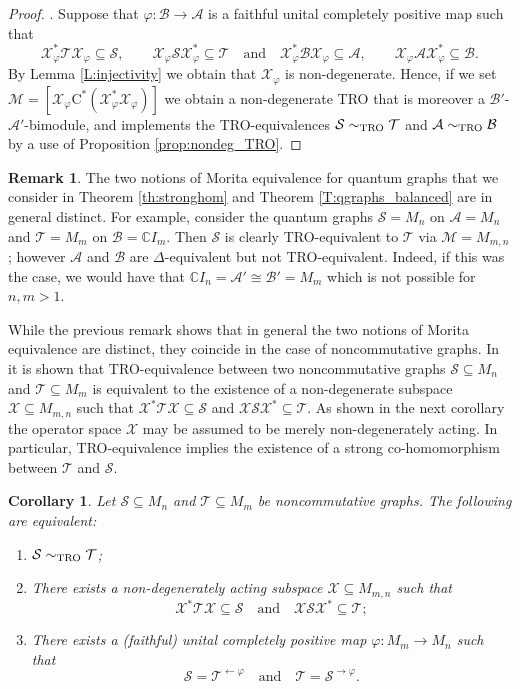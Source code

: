 \documentclass[11pt]{amsart}
\numberwithin{equation}{section}
\theoremstyle{plain}
\newtheorem{corollary}[theorem]{Corollary}
\theoremstyle{definition}
\newtheorem{remark}[theorem]{Remark}
\theoremstyle{remark}
\newcommand{\A}{{\mathcal{A}}}
\newcommand{\B}{{\mathcal{B}}}
\newcommand{\M}{{\mathcal{M}}}
\renewcommand{\S}{{\mathcal{S}}}
\newcommand{\T}{{\mathcal{T}}}
\newcommand{\X}{{\mathcal{X}}}
\def\De{\Delta}
\newcommand\vphi{\varphi}
\newcommand{\bC}{\mathbb{C}}
\newcommand{\qand}{\quad\text{and}\quad}
\newcommand{\ca}{\mathrm{C}^*}
\begin{document}
\begin{proof}
\medskip
\noindent
[(ii) $\Rightarrow$ (i)].
Suppose that
$\vphi\colon\B\to \A$ is a faithful unital completely positive map such that
\[
\X_\vphi^*\T\X_\vphi\subseteq \S,
\qquad
\X_\vphi \S \X_\vphi^*\subseteq \T 
\qand
\X_\vphi^*\B\X_\vphi\subseteq \A,
\qquad
\X_\vphi\A\X_\vphi^*\subseteq \B.
\]
By Lemma \ref{L:injectivity} we obtain that $\X_{\vphi}$ is non-degenerate. Hence, if we set $ \M = [\X_{\vphi} \ca(\X_{\vphi}^*\X_{\vphi})]$ we obtain a non-degenerate TRO that is moreover a $\B'$-$\A'$-bimodule, and implements the TRO-equivalences $\S\sim_{\rm TRO}\T$ and $\A\sim_{\rm TRO}\B$ by a use of Proposition \ref{prop:nondeg_TRO}.
\end{proof}

\begin{remark}
The two notions of Morita equivalence for quantum graphs that we consider in Theorem \ref{th:stronghom} and Theorem \ref{T:qgraphs_balanced} are in general distinct. For example, consider the quantum graphs $\S=M_n$ on $\A = M_n$ and $ \T= M_m$ on $\B=\bC I_m$. Then $ \S$ is clearly TRO-equivalent to $\T $ via $\M= M_{m,n}$; however $ \A$ and $\B$ are $\De$-equivalent but not TRO-equivalent. Indeed, if this was the case, we would have that $\bC I_n= \A' \cong \B'= M_m$ which is not possible for $ n,m>1$.    
\end{remark}

While the previous remark shows that in general the two notions of Morita equivalence are distinct, they coincide in the case of noncommutative graphs. In \cite[Proposition 7.2]{EKT21} it is shown that TRO-equivalence between two noncommutative graphs $\S \subseteq M_n$ and $\T \subseteq M_m$ is equivalent to the existence of a non-degenerate subspace $\X \subseteq M_{m,n} $  such that $\X^*\T \X \subseteq \S$ and $ \X \S \X^* \subseteq \T$. As shown in the next corollary the operator space $\X$ may be assumed to be merely non-degenerately acting.  In particular, TRO-equivalence implies the existence of a strong co-homomorphism between $\T$ and $\S$.

\begin{corollary} \label{T:ncgraphs}
Let $\S \subseteq M_n$ and $\T \subseteq M_m$ be noncommutative graphs.  
The following are equivalent:
\begin{enumerate}
\item $\S \sim_{\rm TRO} \T$;
\item There exists a non-degenerately acting subspace $ \X \subseteq M_{m,n}$ such that 
\[
\X^*\T \X \subseteq\S \qand \X\S\X^* \subseteq \T;
\]
\item There exists a (faithful) unital completely positive map $ \vphi \colon M_m \to M_n$ such that 
\[
\S = \T^{\leftarrow\vphi} \qand\T = \S^{\rightarrow\vphi}.
\]
\end{enumerate}
\end{corollary}
\end{document}
